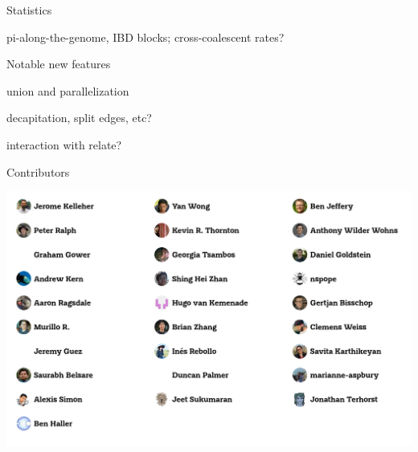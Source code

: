 \documentclass[landscape,a0paper,fontscale=0.4]{baposter}
\begin{document}
\begin{poster}
\begin{posterbox}[name=vizex,below=viz,column=2,row=0,span=1]{}
\end{posterbox}



\begin{posterbox}[name=stats,column=3,row=0,span=1]{Statistics}

pi-along-the-genome, IBD blocks; cross-coalescent rates?

\end{posterbox}


\begin{posterbox}[name=operations,column=3,below=stats,span=1]{Notable new features}

union and parallelization

decapitation, split edges, etc?

interaction with relate?


\end{posterbox}



\begin{posterbox}[name=refs,column=3,above=bottom]{Contributors}

    \includegraphics[width=\textwidth]{tskit-contributors}


\end{posterbox}
\end{poster}
\end{document}
